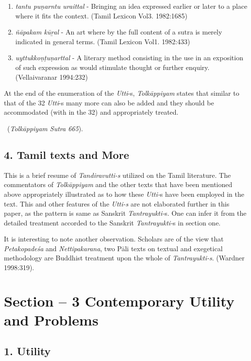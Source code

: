 \begin{enumerate}
 \item \textit{tantu puṇarntu uraittal} - Bringing an idea expressed earlier or later to a place where it fits the context. (Tamil Lexicon Vol3. 1982:1685)

 \item \textit{ñāpakam kūṟal} - An art where by the full content of a sutra is merely indicated in general terms. (Tamil Lexicon Vol1. 1982:433)

 \item \textit{uyttukkoṇṭuṇarttal} - A literary method consisting in the use in an exposition of such expression as would stimulate thought or further enquiry. (Vellaivaranar 1994:232)

\end{enumerate}

At the end of the enumeration of the \textit{Utti}-s, \textit{Tolkāppiyam} states that similar to that of the 32 \textit{Utti}-s many more can also be added and they should be accommodated (with in the 32) and appropriately treated.

~\hfill (\textit{Tolkāppiyam Sutra 665}).


\subsection*{4. Tamil texts and More}

This is a brief resume of \textit{Tandiravutti-s} utilized on the Tamil literature. The commentators of \textit{Tolkāppiyam} and the other texts that have been mentioned above appropriately illustrated as to how these \textit{Utti-}s have been employed in the text. This and other features of the \textit{Utti-s} are not elaborated further in this paper, as the pattern is same as Sanskrit \textit{Tantrayukti-}s. One can infer it from the detailed treatment accorded to the Sanskrit \textit{Tantrayukti-}s in section one.

It is interesting to note another observation. Scholars are of the view that \textit{Petakopadeśa} and \textit{Nettipakarana}, two Pāli texts on textual and exegetical methodology are Buddhist treatment upon the whole of \textit{Tantrayukti-s}. (Wardner 1998:319).


\section*{Section – 3 Contemporary Utility and Problems}

\subsection*{1. Utility}

